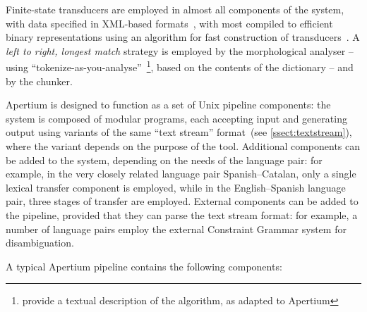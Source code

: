 Finite-state transducers are employed in almost all components of the system, with data specified in XML-based 
formats~\citep{apertium}, with most compiled to efficient binary representations using an algorithm for fast 
construction of transducers~\citep{rojas2005}. A \textit{left to right, longest match} strategy is employed 
by the morphological analyser -- using ``tokenize-as-you-analyse''~\citet{garrido-alenda02}\footnote{\citet[Ch. 3]{apertium} provide a textual 
description of the algorithm, as adapted to Apertium}, based on the contents of the dictionary -- and by the chunker. 

Apertium is designed to function as a set of Unix pipeline components: the system is composed of modular
programs, each accepting input and generating output using variants of the same ``text stream'' 
format~(see \ref{ssect:textstream}), where the variant depends on the purpose of the tool. Additional
components can be added to the system, depending on the needs of the language pair: for example, in the
very closely related language pair Spanish--Catalan, only a single lexical transfer component is
employed, while in the English--Spanish language pair, three stages of transfer are employed. External
components can be added to the pipeline, provided that they can parse the text stream format: for example,
a number of language pairs employ the external Constraint Grammar system for disambiguation.

A typical Apertium pipeline contains the following components:

